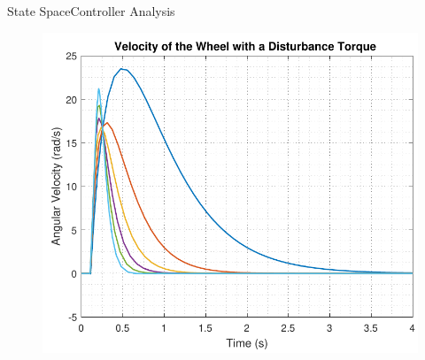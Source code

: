 \begin{frame}{State Space}{Controller Analysis}
\begin{minipage}{\linewidth}
\begin{minipage}{0.45\linewidth}
\begin{figure}[H]
   			\includegraphics[scale=.35]{Pictures/disturbanceStateSpaceWheel}
   			\centering
   		\end{figure}
   	\end{minipage}
  \end{minipage}
\end{frame}

